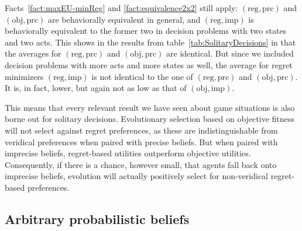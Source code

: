 \documentclass[fleqn,reqno,12pt]{article}
\theoremstyle{Satz}
\theoremstyle{Bsp}
\begin{document}
Facts~\ref{fact:maxEU-minReg} and \ref{fact:equivalence2x2} still apply:
$(\text{reg}, \text{prc})$ and $(\text{obj}, \text{prc})$ are behaviorally equivalent in
general, and $(\text{reg}, \text{imp})$ is behaviorally equivalent to the former two in
decision problems with two states and two acts. This shows in the results from
table~\ref{tab:SolitaryDecisions} in that the averages for $(\text{reg}, \text{prc})$ and
$(\text{obj}, \text{prc})$ are identical. But since we included decision problems with more
acts and more states as well, the average for regret minimizers $(\text{reg}, \text{imp})$ is
not identical to the one of $(\text{reg}, \text{prc})$ and $(\text{obj}, \text{prc})$. It
is, in fact, lower, but again not as low as that of $(\text{obj}, \text{imp})$.

This means that every relevant result we have seen about game situations is also borne out for
solitary decisions. Evolutionary selection based on objective fitness will not select against
regret preferences, as these are indistinguishable from veridical preferences
when paired with precise beliefs. But when paired with imprecise beliefs, regret-based
utilities outperform objective utilities. Consequently, if there is a chance, however
small, that agents fall back onto imprecise beliefs, evolution will actually positively select
for non-veridical regret-based preferences.





\iffalse
\subsection{Arbitrary probabilistic beliefs}
\label{sec:arbitr-prob-beli}
\end{document}
